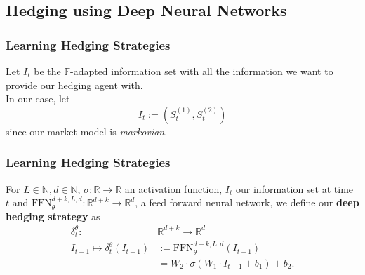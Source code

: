 \documentclass[serif]{beamer}
\def\R{{\mathbb R}}
\def\N{{\mathbb N}}
\def\F{{\mathbb F}}
\def\vs{{\vspace{0.5cm}}}
\begin{document}
\subsection{Hedging using Deep Neural Networks}

\begin{frame}
    \frametitle{Learning Hedging Strategies}
    \begin{definition}
        Let $I_t$ be the $\F$-adapted information
        set with all the information we want to provide our
        hedging agent with. \\ \vs
        In our case, let
        \[
            I_t := (S^{(1)}_t, S^{(2)}_t)
        \]
        since our market model is \emph{markovian}.
    \end{definition}
\end{frame}

\begin{frame}
    \frametitle{Learning Hedging Strategies}
    \begin{definition}
        For $L \in \N, d \in \N$, $\sigma: \R \to \R$
        an activation function,
        $I_t$ our information set at time $t$ and
        $\text{FFN}_\theta^{d+k, L, d} : \R^{d+k} \to \R^d$,
        a feed forward neural network, we define
        our \textbf{deep hedging strategy} as
        \begin{align*}
            \delta^\theta_t:
            \;\; & \R^{d+k} \to \R^d                                   \\
            I_{t-1} \mapsto \delta^\theta_t (I_{t-1})
                 & := \text{FFN}_\theta^{d+k, L, d} (I_{t-1})          \\
                 & = W_2 \cdot \sigma (W_1 \cdot I_{t-1} + b_1) + b_2.
        \end{align*}
    \end{definition}
\end{frame}
\end{document}
